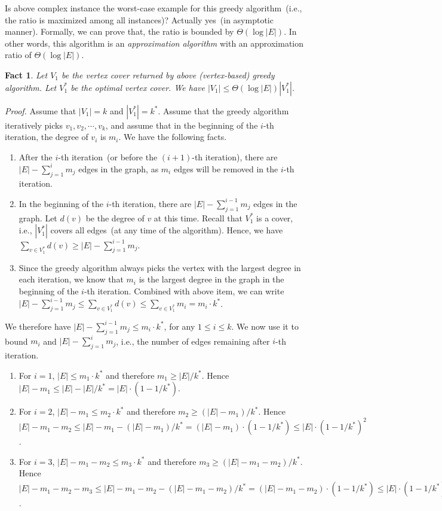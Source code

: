 \documentclass[letterpaper,11pt]{article}
\theoremstyle{mytheorem}
\newtheorem{fact}{Fact}
\begin{document}
Is above complex instance the worst-case example for this greedy algorithm~(i.e.,
the ratio is maximized among all instances)?
Actually yes~(in asymptotic manner).
Formally, we can prove that, the ratio is bounded by $\Theta(\log |E|)$. In
other words, this algorithm is an \emph{approximation algorithm} with an approximation
ratio of $\Theta(\log |E|)$.
\begin{fact}
Let $V_1$ be the vertex cover returned by above (vertex-based) greedy algorithm.
Let $V_1^*$ be the optimal vertex cover.
We have $|V_1| \le \Theta(\log |E|) |V_1^*|$.
\end{fact}
\emph{Proof.}
Assume that $|V_1| = k$ and $|V_1^*| = k^*$.
Assume that the greedy algorithm iteratively picks $v_1, v_2, \cdots, v_k$,
and assume that in the beginning of the $i$-th iteration, the degree of $v_i$ is $m_i$.  We have the following facts.
\vspace*{-\topsep}
\begin{enumerate}
\item After the $i$-th iteration~(or before the $(i+1)$-th iteration),
there are $|E| - \sum_{j=1}^i m_j$ edges in the graph,
as $m_i$ edges will be removed in the $i$-th iteration.
\item In the beginning of the $i$-th iteration,
there are $|E| - \sum_{j=1}^{i-1} m_j$ edges in the graph.
Let $d(v)$ be the degree of $v$ at this time. 
Recall that $V_1^*$ is a cover, i.e., $|V_1^*|$ covers all edges~(at any time of the algorithm). 
Hence, we have $\sum_{v\in V_1^*} d(v) \ge |E| - \sum_{j=1}^{i-1} m_j$.
\item Since the greedy algorithm always picks the vertex
with the largest degree in each iteration, we know that $m_i$ is the largest 
degree in the graph in the beginning of the $i$-th iteration.
Combined with above item, we can write $|E| - \sum_{j=1}^{i-1} m_j \le \sum_{v\in V_1^*} d(v) \le \sum_{v\in V_1^*} m_i = m_i \cdot k^*$.
\end{enumerate}

We therefore have $|E| - \sum_{j=1}^{i-1} m_j \le  m_i \cdot k^*$, for any $1\le i \le k$.
We now use it to bound $m_i$ and $|E| - \sum_{j=1}^{i} m_j$, i.e., the number of edges remaining after $i$-th iteration. 
\vspace*{-\topsep}
\begin{enumerate}
\item For $i = 1$, $|E| \le m_1 \cdot k^*$ and therefore $m_1 \ge |E| / k^*$.
Hence $|E| - m_1 \le |E| - |E|/k^* = |E| \cdot (1-1/k^*)$.

\item For $i = 2$, $|E| - m_1 \le m_2 \cdot k^*$ and therefore $m_2 \ge (|E| - m_1) / k^*$.
Hence $|E| - m_1 - m_2 \le |E| - m_1 - (|E| - m_1)/k^* = (|E| - m_1) \cdot (1-1/k^*) \le |E|\cdot(1-1/k^*)^2$.

\item For $i = 3$, $|E| - m_1 - m_2 \le m_3 \cdot k^*$ and therefore $m_3 \ge (|E| - m_1 - m_2) / k^*$.
Hence $|E| - m_1 - m_2 - m_3\le |E| - m_1 - m_2 - (|E| - m_1 - m_2)/k^* = (|E| - m_1 - m_2) \cdot (1-1/k^*) \le |E|\cdot(1-1/k^*)^3$.
\end{enumerate}
\end{document}
